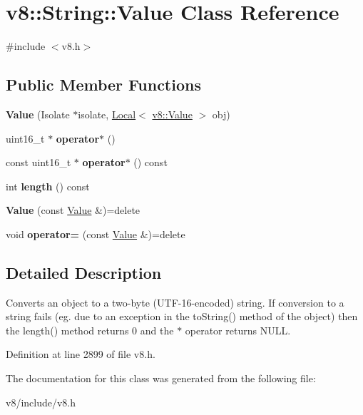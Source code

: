 \hypertarget{classv8_1_1String_1_1Value}{}\section{v8\+:\+:String\+:\+:Value Class Reference}
\label{classv8_1_1String_1_1Value}


{\ttfamily \#include $<$v8.\+h$>$}

\subsection*{Public Member Functions}
\begin{DoxyCompactItemize}
\item 
\mbox{\label{classv8_1_1String_1_1Value_a9254394df4e1c4a8d9749cc0a5b55601}} 
{\bfseries Value} (Isolate $\ast$isolate, \mbox{\hyperlink{classv8_1_1Local}{Local}}$<$ \mbox{\hyperlink{classv8_1_1Value}{v8\+::\+Value}} $>$ obj)
\item 
\mbox{\label{classv8_1_1String_1_1Value_ae4f44b1977968de2e9f2ff703437fde3}} 
uint16\+\_\+t $\ast$ {\bfseries operator$\ast$} ()
\item 
\mbox{\label{classv8_1_1String_1_1Value_a15e247c80ec874daee13e6fca1b24629}} 
const uint16\+\_\+t $\ast$ {\bfseries operator$\ast$} () const
\item 
\mbox{\label{classv8_1_1String_1_1Value_aeb5be29097c4c23c2c63fe833145dfe4}} 
int {\bfseries length} () const
\item 
\mbox{\label{classv8_1_1String_1_1Value_ac7ef41f1e6890bb36bde462a11ea4de1}} 
{\bfseries Value} (const \mbox{\hyperlink{classv8_1_1String_1_1Value}{Value}} \&)=delete
\item 
\mbox{\label{classv8_1_1String_1_1Value_adb46ab85e1def9411012c67cbefb3385}} 
void {\bfseries operator=} (const \mbox{\hyperlink{classv8_1_1String_1_1Value}{Value}} \&)=delete
\end{DoxyCompactItemize}


\subsection{Detailed Description}
Converts an object to a two-\/byte (U\+T\+F-\/16-\/encoded) string. If conversion to a string fails (eg. due to an exception in the to\+String() method of the object) then the length() method returns 0 and the $\ast$ operator returns N\+U\+LL. 

Definition at line 2899 of file v8.\+h.



The documentation for this class was generated from the following file\+:\begin{DoxyCompactItemize}
\item 
v8/include/v8.\+h\end{DoxyCompactItemize}
